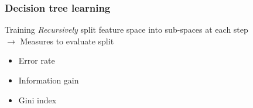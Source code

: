 \documentclass{beamer}
\begin{document}




\begin{frame}
    \frametitle{Decision tree learning}
    \vspace*{-7mm}
    \begin{block}{Training}
        \emph{Recursively} split feature space into sub-spaces at each step\\
        $\to$ Measures to evaluate split
        \begin{itemize}
            \item Error rate
            \item Information gain
            \item Gini index
        \end{itemize}
    \end{block}
\end{frame}
\end{document}
